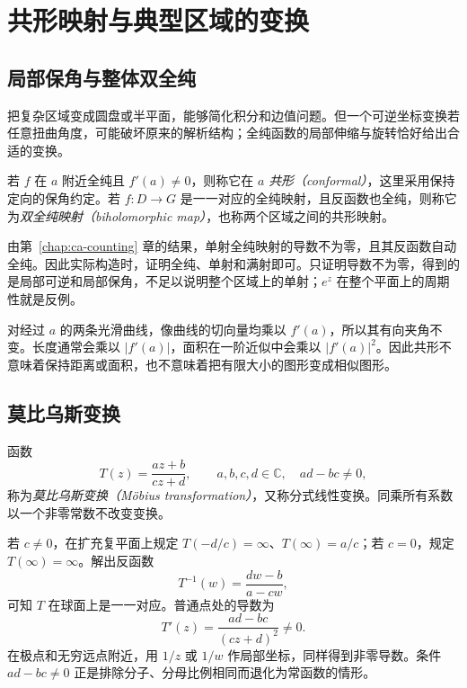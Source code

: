 \setcounter{chapter}{10} %
\chapter{共形映射与典型区域的变换}
\label{chap:ca-conformal}

\section{局部保角与整体双全纯}

把复杂区域变成圆盘或半平面，能够简化积分和边值问题。但一个可逆坐标变换若任意扭曲角度，可能破坏原来的解析结构；全纯函数的局部伸缩与旋转恰好给出合适的变换。

\begin{definition}[共形与双全纯]
若 $f$ 在 $a$ 附近全纯且 $f'(a)\ne0$，则称它在 $a$ \emph{共形（conformal）}，这里采用保持定向的保角约定。若 $f:D\to G$ 是一一对应的全纯映射，且反函数也全纯，则称它为\emph{双全纯映射（biholomorphic map）}，也称两个区域之间的共形映射。
\end{definition}

由第~\ref{chap:ca-counting} 章的结果，单射全纯映射的导数不为零，且其反函数自动全纯。因此实际构造时，证明全纯、单射和满射即可。只证明导数不为零，得到的是局部可逆和局部保角，不足以说明整个区域上的单射；$e^z$ 在整个平面上的周期性就是反例。

对经过 $a$ 的两条光滑曲线，像曲线的切向量均乘以 $f'(a)$，所以其有向夹角不变。长度通常会乘以 $|f'(a)|$，面积在一阶近似中会乘以 $|f'(a)|^2$。因此共形不意味着保持距离或面积，也不意味着把有限大小的图形变成相似图形。

\section{莫比乌斯变换}

\begin{definition}[莫比乌斯变换]
函数
\begin{equation}
 T(z)=\frac{az+b}{cz+d},\qquad a,b,c,d\in\mathbb C,\quad ad-bc\ne0,
 \label{eq:ca-mobius}
\end{equation}
称为\emph{莫比乌斯变换（Möbius transformation）}，又称分式线性变换。同乘所有系数以一个非零常数不改变变换。
\end{definition}

若 $c\ne0$，在扩充复平面上规定 $T(-d/c)=\infty$、$T(\infty)=a/c$；若 $c=0$，规定 $T(\infty)=\infty$。解出反函数
\[
 T^{-1}(w)=\frac{dw-b}{a-cw},
\]
可知 $T$ 在球面上是一一对应。普通点处的导数为
\[
 T'(z)=\frac{ad-bc}{(cz+d)^2}\ne0.
\]
在极点和无穷远点附近，用 $1/z$ 或 $1/w$ 作局部坐标，同样得到非零导数。条件 $ad-bc\ne0$ 正是排除分子、分母比例相同而退化为常函数的情形。

